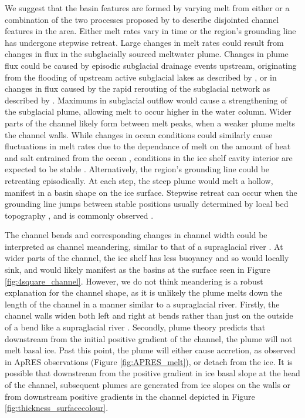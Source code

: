 We suggest that the basin features are formed by varying melt from either or a combination of the two processes proposed by \cite{horgan2017poststagnation} to describe disjointed channel features in the area. Either melt rates vary in time or the region's grounding line has undergone stepwise retreat.
Large changes in melt rates could result from changes in flux in the subglacially sourced meltwater plume. Changes in plume flux could be caused by episodic subglacial drainage events upstream, originating from the flooding of upstream active subglacial lakes as described by \cite{kim2016active}, or in changes in flux caused by the rapid rerouting of the subglacial network as described by \cite{carter2012supply}. Maximums in subglacial outflow would cause a strengthening of the subglacial plume, allowing melt to occur higher in the water column. Wider parts of the channel likely form between melt peaks, when a weaker plume melts the channel walls.
While changes in ocean conditions could similarly cause fluctuations in melt rates due to the dependance of melt on the amount of heat and salt entrained from the ocean \citep{jenkins1991one}, conditions in the ice shelf cavity interior are expected to be stable \citep{stevens2020ocean}. 
Alternatively, the region's grounding line could be retreating episodically. At each step, the steep plume would melt a hollow, manifest in a basin shape on the ice surface.
 Stepwise retreat can occur when the grounding line jumps between stable positions usually determined by local bed topography \citep{haseloff2018effect}, and is commonly observed \cite [e.g.][] {jakobsson2012ice}.  
 

The channel bends and corresponding changes in channel width could be interpreted as channel meandering, similar to that of a supraglacial river \cite [e.g.][] {ferguson1973sinuosity}. 
At wider parts of the channel, the ice shelf has less buoyancy and so would locally sink, and would likely manifest as the basins at the surface seen in Figure \ref{fig:4square_channel}. However, we do not think meandering is a robust explanation for the channel shape, as it is unlikely the plume melts down the length of the channel in a manner similar to a supraglacial river. 
Firstly, the channel walls widen both left and right at bends rather than just on the outside of a bend like a supraglacial river \citep{ferguson1973sinuosity}.
Secondly, plume theory predicts that downstream from the initial positive gradient of the channel, the plume will not melt basal ice. Past this point, the plume will either cause accretion, as observed in ApRES observations (Figure \ref{fig:APRES_melt}), or detach from the ice.  It is possible that downstream from the positive gradient in ice basal slope at the head of the channel, subsequent plumes are generated from ice slopes on the walls or from downstream positive gradients in the channel depicted in Figure \ref{fig:thickness_surfacecolour}. 

